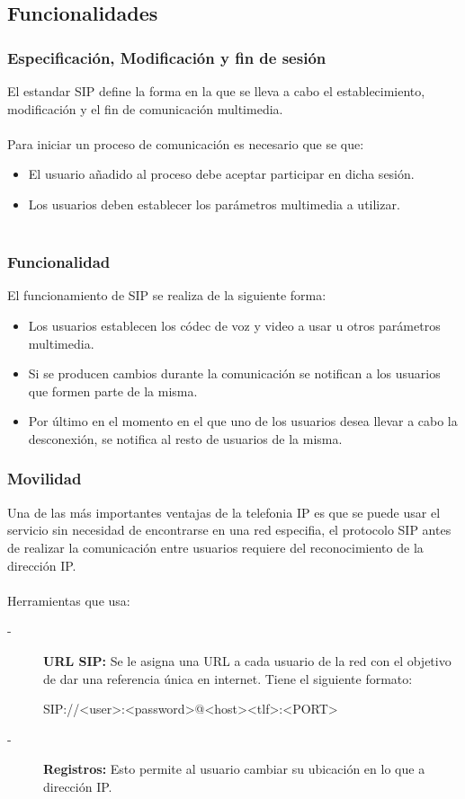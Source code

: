 \documentclass{beamer}
\begin{document}
\subsection{Funcionalidades}
\begin{frame}
\frametitle{Especificación, Modificación y fin de sesión}
El estandar SIP define la forma en la que se lleva a cabo el establecimiento, modificación y el fin de comunicación multimedia. \\~\\
Para iniciar un proceso de comunicación es necesario que se que:
		\begin{itemize}
			\item El usuario añadido al proceso debe aceptar participar en dicha sesión.
			\item Los usuarios deben establecer los parámetros multimedia a utilizar.\\~\\
		\end{itemize}	
\end{frame}
\begin{frame}
\frametitle{Funcionalidad}
		El funcionamiento de SIP se realiza de la siguiente forma:
		\begin{itemize}
			\item Los usuarios establecen los códec de voz y video a usar u otros parámetros multimedia.
			\item Si se producen cambios durante la comunicación se notifican a los usuarios que formen parte de la misma.
			\item Por último en el momento en el que uno de los usuarios desea llevar a cabo la desconexión, se notifica al resto de usuarios de la misma.
		\end{itemize}
\end{frame}
\begin{frame}
\frametitle{Movilidad}
		Una de las más importantes ventajas de la telefonia IP es que se puede usar el servicio sin necesidad de encontrarse en una red especifia, el protocolo SIP antes de realizar la comunicación entre usuarios requiere del reconocimiento de la dirección IP.\\~\\
	Herramientas que usa:
		\begin{description}
		\item[-]\textbf{URL SIP:} Se le asigna una URL a cada usuario de la red con el objetivo de dar una referencia única en internet. Tiene el siguiente formato:\\
		\begin{example}
		SIP://<user>:<password>@<host><tlf>:<PORT>
		\end{example}

		\item[-]\textbf{Registros:} Esto permite al usuario cambiar su ubicación en lo que a dirección IP.
		\end{description}
\end{frame}
\end{document}
